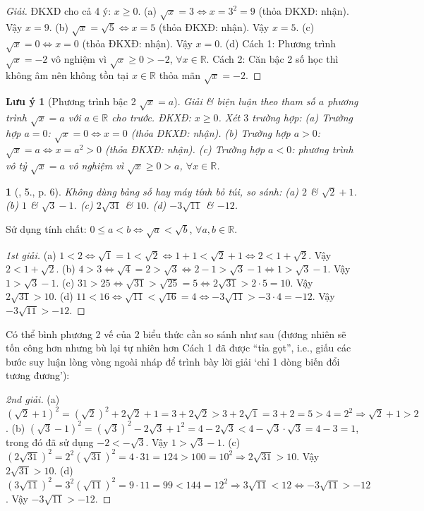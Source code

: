 \documentclass{article}
\newtheorem{baitoan}{}%
\newtheorem{luuy}{Lưu ý}
\begin{document}
\begin{proof}[Giải]
	ĐKXĐ cho cả 4 ý: $x\ge0$. (a) $\sqrt{x} = 3\Leftrightarrow x = 3^2 = 9$ (thỏa ĐKXĐ: nhận). Vậy $x = 9$. (b) $\sqrt{x} = \sqrt{5}\Leftrightarrow x = 5$ (thỏa ĐKXĐ: nhận). Vậy $x = 5$. (c) $\sqrt{x} = 0\Leftrightarrow x = 0$ (thỏa ĐKXĐ: nhận). Vậy $x = 0$. (d) {\sf Cách 1:} Phương trình $\sqrt{x} = -2$ vô nghiệm vì $\sqrt{x}\ge0 > -2$, $\forall x\in\mathbb{R}$. {\sf Cách 2:} Căn bậc 2 số học thì không âm nên không tồn tại $x\in\mathbb{R}$ thỏa mãn $\sqrt{x} = -2$.
\end{proof}

\begin{luuy}[Phương trình bậc 2 $\sqrt{x} = a$]
	Giải \& biện luận theo tham số $a$ phương trình $\sqrt{x} = a$ với $a\in\mathbb{R}$ cho trước. ĐKXĐ: $x\ge0$. Xét $3$ trường hợp: (a) Trường hợp $a = 0$: $\sqrt{x} = 0\Leftrightarrow x = 0$ (thỏa ĐKXĐ: nhận). (b) Trường hợp $a > 0$: $\sqrt{x} = a\Leftrightarrow x = a^2 > 0$ (thỏa ĐKXĐ: nhận). (c) Trường hợp $a < 0$: phương trình vô tỷ $\sqrt{x} = a$ vô nghiệm vì $\sqrt{x}\ge0 > a$, $\forall x\in\mathbb{R}$.
\end{luuy}

\begin{baitoan}[\cite{SBT_Toan_9_tap_1}, 5., p. 6]
	Không dùng bảng số hay máy tính bỏ túi, so sánh: (a) $2$ \& $\sqrt{2} + 1$. (b) $1$ \& $\sqrt{3} - 1$. (c) $2\sqrt{31}$ \& $10$. (d) $-3\sqrt{11}$ \& $-12$.
\end{baitoan}
 Sử dụng tính chất: $0\le a < b\Leftrightarrow\sqrt{a} < \sqrt{b}$, $\forall a,b\in\mathbb{R}$.

\begin{proof}[1st giải]
	(a) $1 < 2\Leftrightarrow\sqrt{1} = 1 < \sqrt{2}\Leftrightarrow1 + 1 < \sqrt{2} + 1\Leftrightarrow 2 < 1 + \sqrt{2}$. Vậy $2 < 1 + \sqrt{2}$. (b) $4 > 3\Leftrightarrow\sqrt{4} = 2 > \sqrt{3}\Leftrightarrow2 - 1 > \sqrt{3} - 1\Leftrightarrow1 > \sqrt{3} - 1$. Vậy $1 > \sqrt{3} - 1$. (c) $31 > 25\Leftrightarrow\sqrt{31} > \sqrt{25} = 5\Leftrightarrow2\sqrt{31} > 2\cdot5 = 10$. Vậy $2\sqrt{31} > 10$. (d) $11 < 16\Leftrightarrow\sqrt{11} < \sqrt{16} = 4\Leftrightarrow-3\sqrt{11} > -3\cdot4 = -12$. Vậy $-3\sqrt{11} > -12$.
\end{proof}
Có thể bình phương 2 vế của 2 biểu thức cần so sánh như sau (đương nhiên sẽ tốn công hơn nhưng bù lại tự nhiên hơn Cách 1 đã được ``tỉa gọt'', i.e., giấu các bước suy luận lòng vòng ngoài nháp để trình bày lời giải `chỉ 1 dòng biến đổi tương đương'):
\begin{proof}[2nd giải]
	(a) $(\sqrt{2} + 1)^2 = (\sqrt{2})^2 + 2\sqrt{2} + 1 = 3 + 2\sqrt{2} > 3 + 2\sqrt{1} = 3 + 2 = 5 > 4 = 2^2\Rightarrow\sqrt{2} + 1 > 2$. (b) $(\sqrt{3} - 1)^2 = (\sqrt{3})^2 - 2\sqrt{3} + 1^2 = 4 - 2\sqrt{3} < 4 - \sqrt{3}\cdot\sqrt{3} = 4 - 3 = 1$, trong đó đã sử dụng $-2 < -\sqrt{3}$. Vậy $1 > \sqrt{3} - 1$. (c) $(2\sqrt{31})^2 = 2^2(\sqrt{31})^2 = 4\cdot31 = 124 > 100 = 10^2\Rightarrow2\sqrt{31} > 10$. Vậy $2\sqrt{31} > 10$. (d) $(3\sqrt{11})^2 = 3^2(\sqrt{11})^2 = 9\cdot11 = 99 < 144 = 12^2\Rightarrow3\sqrt{11} < 12\Leftrightarrow-3\sqrt{11} > -12$. Vậy $-3\sqrt{11} > -12$.
\end{proof}
\end{document}
